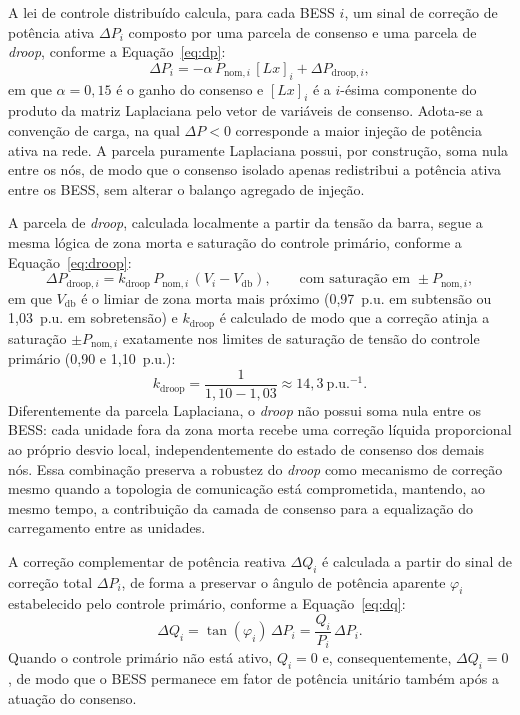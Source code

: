 A lei de controle distribuído calcula, para cada BESS $i$, um sinal de correção de potência ativa $\Delta P_i$ composto por uma parcela de consenso e uma parcela de \emph{droop}, conforme a Equação~\eqref{eq:dp}:
\begin{equation}
  \Delta P_i = -\alpha\, P_{\text{nom},i}\, [L x]_i + \Delta P_{\text{droop},i},
  \label{eq:dp}
\end{equation}
em que $\alpha = 0{,}15$ é o ganho do consenso e $[L x]_i$ é a $i$-ésima componente do produto da matriz Laplaciana pelo vetor de variáveis de consenso. Adota-se a convenção de carga, na qual $\Delta P < 0$ corresponde a maior injeção de potência ativa na rede. A parcela puramente Laplaciana possui, por construção, soma nula entre os nós, de modo que o consenso isolado apenas redistribui a potência ativa entre os BESS, sem alterar o balanço agregado de injeção.

A parcela de \emph{droop}, calculada localmente a partir da tensão da barra, segue a mesma lógica de zona morta e saturação do controle primário, conforme a Equação~\eqref{eq:droop}:
\begin{equation}
  \Delta P_{\text{droop},i} = k_\text{droop}\, P_{\text{nom},i}\,(V_i - V_\text{db}), \qquad \text{com saturação em } \pm P_{\text{nom},i},
  \label{eq:droop}
\end{equation}
em que $V_\text{db}$ é o limiar de zona morta mais próximo (0,97~p.u. em subtensão ou 1,03~p.u. em sobretensão) e $k_\text{droop}$ é calculado de modo que a correção atinja a saturação $\pm P_{\text{nom},i}$ exatamente nos limites de saturação de tensão do controle primário (0,90 e 1,10~p.u.):
\begin{equation}
  k_\text{droop} = \frac{1}{1{,}10 - 1{,}03} \approx 14{,}3~\text{p.u.}^{-1}.
  \label{eq:kdroop}
\end{equation}
Diferentemente da parcela Laplaciana, o \emph{droop} não possui soma nula entre os BESS: cada unidade fora da zona morta recebe uma correção líquida proporcional ao próprio desvio local, independentemente do estado de consenso dos demais nós. Essa combinação preserva a robustez do \emph{droop} como mecanismo de correção mesmo quando a topologia de comunicação está comprometida, mantendo, ao mesmo tempo, a contribuição da camada de consenso para a equalização do carregamento entre as unidades.

A correção complementar de potência reativa $\Delta Q_i$ é calculada a partir do sinal de correção total $\Delta P_i$, de forma a preservar o ângulo de potência aparente $\varphi_i$ estabelecido pelo controle primário, conforme a Equação~\eqref{eq:dq}:
\begin{equation}
  \Delta Q_i = \tan(\varphi_i)\,\Delta P_i = \frac{Q_i}{P_i}\,\Delta P_i.
  \label{eq:dq}
\end{equation}
Quando o controle primário não está ativo, $Q_i = 0$ e, consequentemente, $\Delta Q_i = 0$, de modo que o BESS permanece em fator de potência unitário também após a atuação do consenso.

